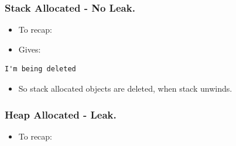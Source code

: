 \subsubsection{Stack Allocated - No
Leak.}\label{stack-allocated---no-leak.}

\begin{itemize}
\itemsep1pt\parskip0pt
\item
  To recap:
\end{itemize}

\begin{Shaded}
\begin{Highlighting}[]
 
  \NormalTok{,}\NormalTok{);}
\NormalTok{\}}

\end{Highlighting}
\end{Shaded}

\begin{itemize}
\itemsep1pt\parskip0pt
\item
  Gives:
\end{itemize}

\begin{verbatim}
I'm being deleted
\end{verbatim}

\begin{itemize}
\itemsep1pt\parskip0pt
\item
  So stack allocated objects are deleted, when stack unwinds.
\end{itemize}

\subsubsection{Heap Allocated - Leak.}\label{heap-allocated---leak.}

\begin{itemize}
\itemsep1pt\parskip0pt
\item
  To recap:
\end{itemize}

\begin{Shaded}
\begin{Highlighting}[]
 
   \NormalTok{,}\NormalTok{);}
\NormalTok{\}}

\end{Highlighting}
\end{Shaded}

